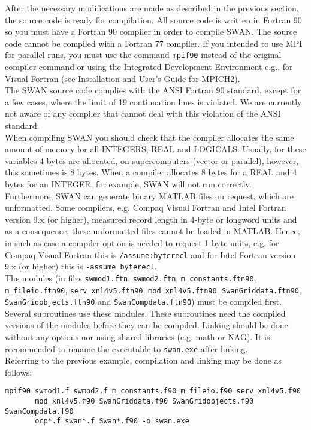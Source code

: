 \documentclass[12pt]{book}
\begin{document}
After the necessary modifications are made as described in the previous section, the source code is
ready for compilation. All source code is written in Fortran 90 so you must have a
Fortran 90 compiler in order to compile SWAN. The source code cannot be compiled with a Fortran 77
compiler. If you intended to use MPI for parallel runs, you must use the command {\tt mpif90} instead
of the original compiler command or using the Integrated Development Environment e.g., for Visual
Fortran (see Installation and User's Guide for MPICH2).
\\[2ex]
\noindent
The SWAN source code complies with the ANSI Fortran 90 standard, except for a few cases, where
the limit of 19 continuation lines is violated. We are currently not aware of any compiler that cannot
deal with this violation of the ANSI standard.
\\[2ex]
\noindent
When compiling SWAN you should check that the compiler allocates the same amount of memory
for all {\scriptsize INTEGERS}, {\scriptsize REAL} and {\scriptsize LOGICALS}. Usually, for these
variables 4 bytes are allocated, on supercomputers (vector or parallel), however, this sometimes
is 8 bytes. When a compiler allocates 8 bytes for a {\scriptsize REAL} and 4 bytes for an
{\scriptsize INTEGER}, for example, SWAN will not run correctly.
\\[2ex]
\noindent
Furthermore, SWAN can generate binary MATLAB files on request, which are unformatted. Some compilers,
e.g. Compaq Visual Fortran and Intel Fortran version 9.x (or higher), measured record length in 4-byte or longword units and
as a consequence, these unformatted files cannot be loaded in MATLAB. Hence, in such as case a
compiler option is needed to request 1-byte units, e.g. for Compaq Visual Fortran this is
{\tt /assume:byterecl} and for Intel Fortran version 9.x (or higher) this is {\tt -assume byterecl}.
\\[2ex]
\noindent
The modules (in files {\tt swmod1.ftn}, {\tt swmod2.ftn}, {\tt m\_constants.ftn90},
{\tt m\_fileio.ftn90}, {\tt serv\_xnl4v5.ftn90}, {\tt mod\_xnl4v5.ftn90},
{\tt SwanGriddata.ftn90}, {\tt SwanGridobjects.ftn90} and {\tt SwanCompdata.ftn90}) must be compiled first.
Several subroutines use these modules. These subroutines need the compiled versions of the modules before they can be compiled.
Linking should be done without any options nor using shared libraries (e.g. math or NAG). It is
recommended to rename the executable to {\tt swan.exe} after linking.
\\[2ex]
\noindent
Referring to the previous example, compilation and linking may be done as follows:
\begin{verbatim}
mpif90 swmod1.f swmod2.f m_constants.f90 m_fileio.f90 serv_xnl4v5.f90
       mod_xnl4v5.f90 SwanGriddata.f90 SwanGridobjects.f90 SwanCompdata.f90
       ocp*.f swan*.f Swan*.f90 -o swan.exe
\end{verbatim}
\end{document}
